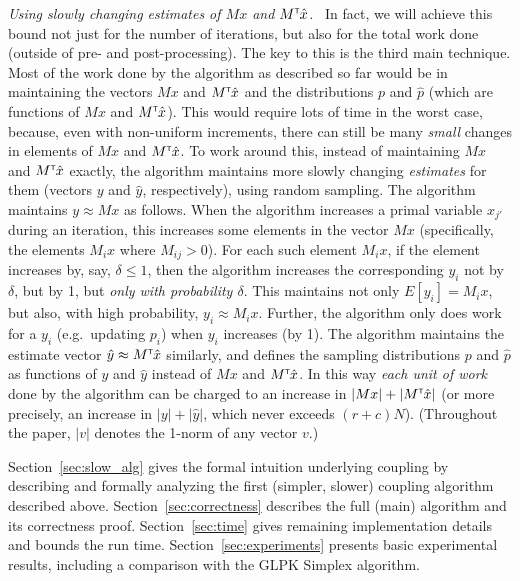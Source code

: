 \documentclass[11pt]{svjour3} \usepackage{fullpage}
\renewcommand{\paragraph}[1]{\smallskip\vspace{2pt}\par{\em #1}~}
\newcommand{\primalOf}[1]{{{#1}}}
\newcommand{\dualOf}[1]{{\hat{#1}}}
\newcommand{\xp}{\primalOf x}
\newcommand{\yp}{\primalOf y}
\newcommand{\pp}{\primalOf p}
\newcommand{\xd}{\dualOf x}
\newcommand{\yd}{\dualOf y}
\newcommand{\pd}{\dualOf p}
\newcommand{\tran}{^{\scriptscriptstyle \sf T\hspace*{-0.05em}}}
\begin{document}
\paragraph{Using slowly changing estimates of $M\xp$ and $M\tran\xd$.}
In fact, we will achieve this bound not just for the number of iterations, 
but also for the total work done (outside of pre- and post-processing).
The key to this is the third main technique.
Most of the work done by the algorithm as described so far
would be in maintaining the vectors $M\xp$ and $M\tran\xd$
and the distributions $\pp$ and $\pd$ (which are functions of $M\xp$ and $M\tran\xd$).
This would require lots of time in the worst case, because, even with non-uniform increments, there can still be many {\em small} changes in elements of $M\xp$ and $M\tran\xd$.
To work around this, instead of maintaining $M\xp$ and $M\tran\xd$ exactly,
the algorithm maintains more slowly changing {\em estimates} for them (vectors $\yp$ and $\yd$, respectively), using random sampling.
The algorithm maintains $\yp \approx M\xp$ as follows.
When the algorithm increases a primal variable $\xp_{j'}$ during an iteration,
this increases some elements in the vector $M\xp$
(specifically, the elements $M_i\xp$ where $M_{ij}>0$).
For each such element $M_i\xp$, if the element increases by, say, $\delta \le 1$,
then the algorithm increases the corresponding $\yp_i$ not by $\delta$, but by 1, but {\em only with probability $\delta$}.
This maintains not only $E[\yp_i] = M_i\xp$, but also, with high probability, $\yp_i \approx M_i\xp$.
Further, the algorithm only does work for a $\yp_i$ (e.g.~updating $\pp_i$)
when $\yp_i$ increases (by 1).
The algorithm maintains the estimate vector $\yd \approx M\tran\xd$ similarly,
and defines the sampling distributions $\pp$ and $\pd$ as functions 
of $\yp$ and $\yd$ instead of $M\xp$ and $M\tran\xd$.
In this way {\em each unit of work}  done by the algorithm
can be charged to an increase in $|M \xp| + |M\tran \xd|$ 
(or more precisely, an increase in $|\yp| + |\yd|$, which never exceeds $(r+c)N$).
(Throughout the paper, $|v|$ denotes the 1-norm of any vector $v$.)

Section~\ref{sec:slow_alg} gives the formal intuition underlying coupling by describing and formally analyzing the first (simpler, slower) coupling algorithm described above.
Section~\ref{sec:correctness} describes the full (main) algorithm and its correctness proof.
Section~\ref{sec:time} gives remaining implementation details and bounds the run time.  
Section~\ref{sec:experiments} presents basic experimental results, including a comparison with the GLPK Simplex algorithm.
\end{document}
